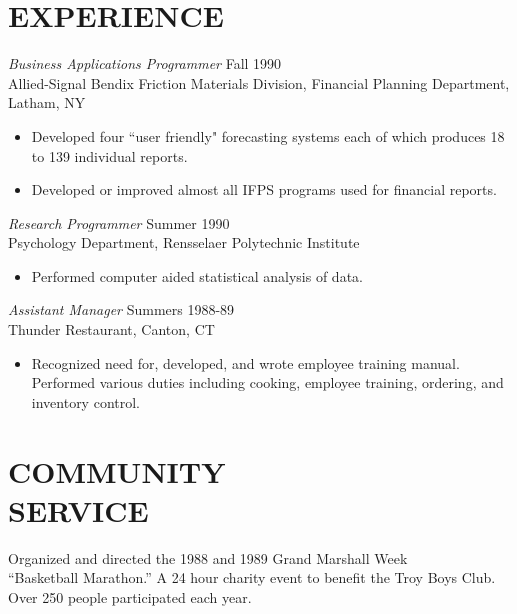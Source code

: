 \documentclass[margin, 10pt]{res} %
\begin{document}
\begin{resume}
    \section{EXPERIENCE}

     {\sl Business Applications Programmer} \hfill Fall 1990 \\
    Allied-Signal Bendix Friction Materials Division, Financial Planning Department, Latham, NY

    \begin{itemize} \itemsep -2pt %
        \item Developed four ``user friendly" forecasting systems each of which produces 18 to 139 individual reports.
        \item Developed or improved almost all IFPS programs used for financial reports.
    \end{itemize}

    {\sl Research Programmer} \hfill Summer 1990 \\
    Psychology Department, Rensselaer Polytechnic Institute
    \begin{itemize}
        \item Performed computer aided statistical analysis of data.
    \end{itemize}

    {\sl Assistant Manager} \hfill Summers 1988-89 \\
    Thunder Restaurant, Canton, CT
    \begin{itemize}
        \item Recognized need for, developed, and wrote employee training manual. Performed various duties including cooking, employee training, ordering, and inventory control.
    \end{itemize}


    \section{COMMUNITY \\ SERVICE}

    Organized and directed the 1988 and 1989 Grand Marshall Week \\
    ``Basketball Marathon.'' A 24 hour charity event to benefit the Troy Boys Club. Over 250 people participated each year.


\end{resume}
\end{document}
